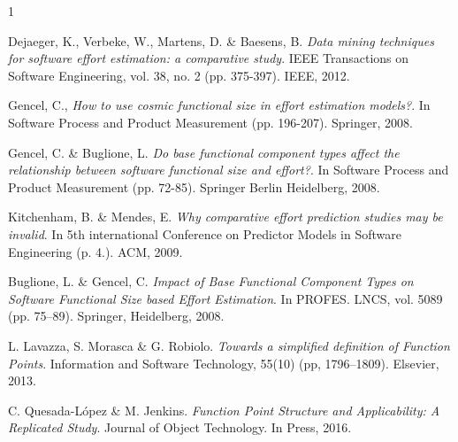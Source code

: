 \documentclass[conference]{IEEEtran}
\begin{document}
%
%
%
\begin{thebibliography}{1}


  Dejaeger, K., Verbeke, W., Martens, D. \& Baesens, B. \emph{Data mining techniques for software effort estimation: a comparative study}. IEEE Transactions on Software Engineering, vol. 38, no. 2 (pp. 375-397). IEEE, 2012.
  
  Gencel, C., \emph{How to use cosmic functional size in effort estimation models?}. In Software Process and Product Measurement (pp. 196-207). Springer, 2008.
  
  Gencel, C. \& Buglione, L. \emph{Do base functional component types affect the relationship between software functional size and effort?}. In Software Process and Product Measurement (pp. 72-85). Springer Berlin Heidelberg, 2008.

  Kitchenham, B. \& Mendes, E. \emph{Why comparative effort prediction studies may be invalid}. In 5th international Conference on Predictor Models in Software Engineering (p. 4.). ACM, 2009.  
  
  Buglione, L. \& Gencel, C.  \emph{Impact of Base Functional Component Types on Software Functional Size based Effort Estimation}. In PROFES. LNCS, vol. 5089 (pp. 75–89). Springer, Heidelberg, 2008.

  L. Lavazza, S. Morasca \& G. Robiolo. \emph{Towards a simplified definition of Function Points}. Information and Software Technology, 55(10) (pp, 1796–1809). Elsevier, 2013.
  
  C. Quesada-L\'opez \& M. Jenkins. \emph{Function Point Structure and Applicability: A Replicated Study}. Journal of Object Technology. In Press, 2016.  
  

\end{thebibliography}
\end{document}
